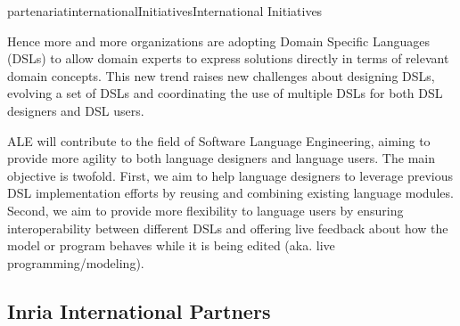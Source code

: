 \documentclass{ra2018}
\begin{document}
\begin{module}{partenariat}{internationalInitiatives}{International Initiatives}
\begin{itemize}
Hence more and more organizations are adopting Domain Specific Languages (DSLs) to allow domain experts to express solutions directly in terms of relevant domain concepts. This new trend raises new challenges about designing DSLs, evolving a set of DSLs and coordinating the use of multiple DSLs for both DSL designers and DSL users.

ALE will contribute to the field of Software Language Engineering, aiming to provide more agility to both language designers and language users. The main objective is twofold. First, we aim to help language designers to leverage previous DSL implementation efforts by reusing and combining existing language modules. Second, we aim to provide more flexibility to  language users by ensuring interoperability between different DSLs and offering live feedback about how the model or program behaves while it is being edited (aka. live programming/modeling). 
\end{itemize}











%




\subsection{Inria International Partners}




\end{module}
\end{document}
